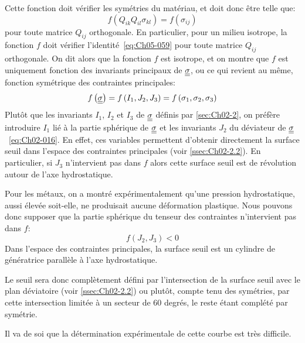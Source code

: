 Cette fonction doit vérifier les symétries du matériau, et doit donc être telle que: 
\begin{equation}
    f \left( Q_{ik} Q_{il} \sigma_{kl} \right) = f \left( \sigma_{ij} \right)
    \label{eq:Ch05-059}
\end{equation}
pour toute matrice $Q_{ij}$ orthogonale.
En particulier, pour un milieu isotrope, la fonction $f$ doit vérifier l'identité~\eqref{eq:Ch05-059} pour toute matrice $Q_{ij}$ orthogonale.
On dit alors que la fonction $f$ est isotrope, et on montre que $f$ est uniquement fonction des invariants principaux de $\underline{\underline{\sigma}}$, ou ce qui revient au même, fonction symétrique des contraintes principales: 
\begin{equation}
    f\left( \underline{\underline{\sigma}} \right) = f \left( I_1, J_2, J_3 \right) = f\left( \sigma_1, \sigma_2, \sigma_3 \right)
    \label{eq:Ch05-060}
\end{equation}
Plutôt que les invariants $I_1$, $I_2$ et $I_3$ de $\underline{\underline{\sigma}}$ définis par \ref{sec:Ch02-2}, on préfère introduire $I_1$ lié à la partie sphérique de $\underline{\underline{\sigma}}$ et les invariants $J_2$ du déviateur de $\underline{\underline{\sigma}}$~\eqref{eq:Ch02-016}.
En effet, ces variables permettent d'obtenir directement la surface seuil dans l'espace des contraintes principales (voir \ref{ssec:Ch02-2.2}).
En particulier, si $J_3$ n'intervient pas dans $f$ alors cette surface seuil est de révolution autour de l'axe hydrostatique.

Pour les métaux, on a montré expérimentalement qu'une pression hydrostatique, aussi élevée soit-elle, ne produisait aucune déformation plastique.
Nous pouvons donc supposer que la partie sphérique du tenseur des contraintes n'intervient pas dans $f$:
\begin{equation}
    f \left( J_2, J_3 \right) < 0
    \label{eq:Ch05-061}
\end{equation}
Dans l'espace des contraintes principales, la surface seuil est un cylindre de génératrice parallèle à l'axe hydrostatique.

Le seuil sera donc complètement défini par l'intersection de la surface seuil avec le plan déviatoire (voir \ref{ssec:Ch02-2.2}) ou plutôt, compte tenu des symétries, par cette intersection limitée à un secteur de 60 degrés, le reste étant complété par symétrie.



Il va de soi que la détermination expérimentale de cette courbe est très difficile.

